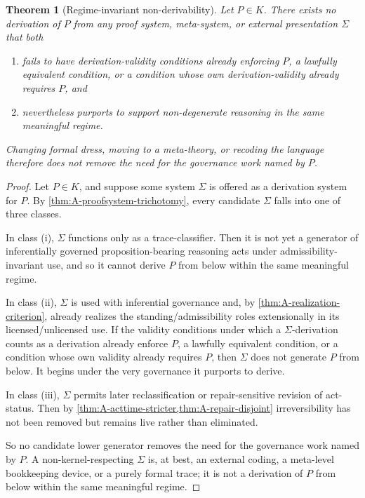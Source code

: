 \documentclass[11pt]{article}
\theoremstyle{plain}
\newtheorem{theorem}{Theorem}[section]
\theoremstyle{definition}
\begin{document}
\begin{theorem}[Regime-invariant non-derivability]
\label{thm:A-regime-invariant}
Let $P\in K$. There exists no derivation of $P$ from any proof system, meta-system, or external presentation $\Sigma$ that both
\begin{enumerate}[label=(\roman*), leftmargin=2.5em]
    \item fails to have derivation-validity conditions already enforcing $P$, a lawfully equivalent condition, or a condition whose own derivation-validity already requires $P$, and
    \item nevertheless purports to support non-degenerate reasoning in the same meaningful regime.
\end{enumerate}
Changing formal dress, moving to a meta-theory, or recoding the language therefore does not remove the need for the governance work named by $P$.
\end{theorem}

\begin{proof}
Let $P\in K$, and suppose some system $\Sigma$ is offered as a derivation system for $P$. By \cref{thm:A-proofsystem-trichotomy}, every candidate $\Sigma$ falls into one of three classes.

In class (i), $\Sigma$ functions only as a trace-classifier. Then it is not yet a generator of inferentially governed proposition-bearing reasoning acts under admissibility-invariant use, and so it cannot derive $P$ from below within the same meaningful regime.

In class (ii), $\Sigma$ is used with inferential governance and, by \cref{thm:A-realization-criterion}, already realizes the standing/admissibility roles extensionally in its licensed/unlicensed use. If the validity conditions under which a $\Sigma$-derivation counts as a derivation already enforce $P$, a lawfully equivalent condition, or a condition whose own validity already requires $P$, then $\Sigma$ does not generate $P$ from below. It begins under the very governance it purports to derive.

In class (iii), $\Sigma$ permits later reclassification or repair-sensitive revision of act-status. Then by \cref{thm:A-acttime-stricter,thm:A-repair-disjoint} irreversibility has not been removed but remains live rather than eliminated.

So no candidate lower generator removes the need for the governance work named by $P$. A non-kernel-respecting $\Sigma$ is, at best, an external coding, a meta-level bookkeeping device, or a purely formal trace; it is not a derivation of $P$ from below within the same meaningful regime.
\end{proof}
\end{document}

